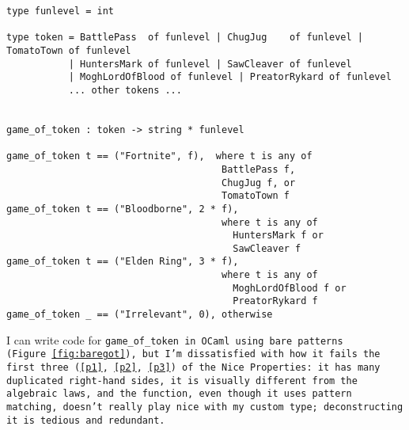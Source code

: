 \documentclass[manuscript,screen,review, 12pt, nonacm]{acmart}
\begin{document}
\begin{minipage}[t]{\textwidth}
    \centering 
    \begin{footnotesize}
      \begin{verbatim}  
type funlevel = int

type token = BattlePass  of funlevel | ChugJug    of funlevel | TomatoTown of funlevel
           | HuntersMark of funlevel | SawCleaver of funlevel
           | MoghLordOfBlood of funlevel | PreatorRykard of funlevel
           ... other tokens ...
                    

game_of_token : token -> string * funlevel

game_of_token t == ("Fortnite", f),  where t is any of 
                                      BattlePass f, 
                                      ChugJug f, or
                                      TomatoTown f
game_of_token t == ("Bloodborne", 2 * f), 
                                      where t is any of 
                                        HuntersMark f or 
                                        SawCleaver f
game_of_token t == ("Elden Ring", 3 * f), 
                                      where t is any of 
                                        MoghLordOfBlood f or  
                                        PreatorRykard f
game_of_token _ == ("Irrelevant", 0), otherwise
      \end{verbatim}
    \end{footnotesize}
  \end{minipage}  
        
        I can write code for \tt{game\_of\_token} in OCaml using bare patterns
        (Figure~\ref{fig:baregot}), but I'm dissatisfied with how it fails the
        first three (\ref{p1}, \ref{p2}, \ref{p3}) of the Nice Properties: it
        has many duplicated right-hand sides, it is visually different from the
        algebraic laws, and the function, even though it uses pattern matching,
        doesn't really play nice with my custom type; deconstructing it is
        tedious and redundant.         
        
\end{document}
